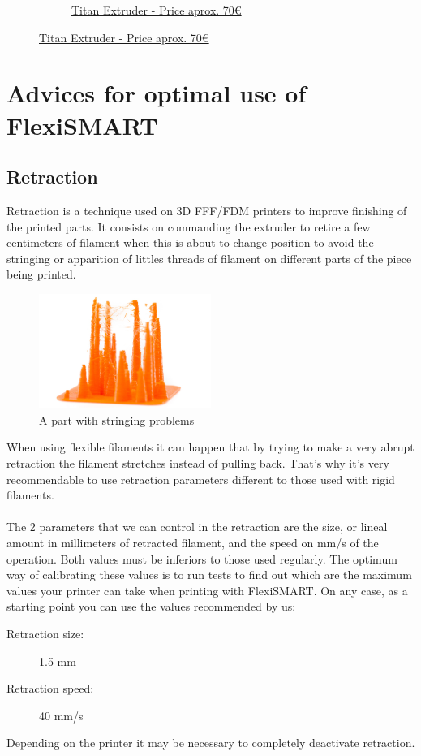 \documentclass[11pt,a4paper]{article}
\begin{document}
\begin{figure}[H]
\begin{subfigure}[b]{0.4\textwidth}
		\caption*{\href{www.e3d-online.com}{{\footnotesize Titan Extruder - Price aprox. 70\euro}}}
    \end{subfigure}
\end{figure}
\section{Advices for optimal use of FlexiSMART}
	\subsection{Retraction}
Retraction is a technique used on 3D FFF/FDM printers to improve finishing of the printed parts. It consists on commanding the extruder to retire a few centimeters of filament when this is about to change position to avoid the stringing or apparition of littles threads of filament on different parts of the piece being printed.
\begin{figure}[H]
\centering
\includegraphics[width=0.5\textwidth,cfbox=azul_marcos 4pt 0pt]{FOTOS/RETRACCION1}
\caption*{A part with stringing problems}
\end{figure}
When using flexible filaments it can happen that by trying to make a very abrupt retraction the filament stretches instead of pulling back. That’s why it’s very recommendable to use retraction parameters different to those used with rigid filaments.
\\\\
The 2 parameters that we can control in the retraction are the size, or lineal amount in millimeters of retracted filament, and the speed on mm/s of the operation. Both values must be inferiors to those used regularly. The optimum way of calibrating these values is to run tests to find out which are the maximum values your printer can take when printing with FlexiSMART. On any case, as a starting point you can use the values recommended by us:
\begin{description}
\item [Retraction size:] 1.5 mm
\item [Retraction speed:] 40 mm/s
\end{description}
Depending on the printer it may be necessary to completely deactivate retraction.
\end{document}

